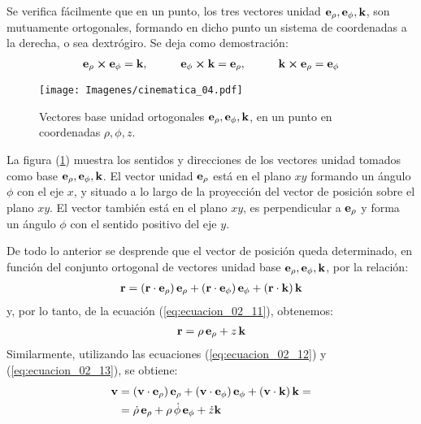 Se verifica fácilmente que en un punto, los tres vectores unidad $\vb{e}_{\rho}, \vb{e}_{\phi}, \vb{k}$, son mutuamente ortogonales, formando en dicho punto un sistema de coordenadas a la derecha, o sea dextrógiro. Se deja como demostración:
\begin{align}
\vb{e}_{\rho} \cp \vb{e}_{\phi} = \vb{k}, \hspace{1cm} \vb{e}_{\phi} \cp \vb{k} = \vb{e}_{\rho}, \hspace{1cm} \vb{k} \cp \vb{e}_{\rho} = \vb{e}_{\phi}
\label{eq:ecuacion_02_16}
\end{align}
\begin{figure}[H]
    \centering
    \texttt{[image: Imagenes/cinematica\_04.pdf]}
    \caption{Vectores base unidad ortogonales $\vb{e}_{\rho}, \vb{e}_{\phi}, \vb{k}$, en un punto en coordenadas $\rho, \phi, z$.}
    \label{fig:figura_02_04}    
\end{figure}
La figura (\ref{fig:figura_02_04}) muestra los sentidos y direcciones de los vectores unidad tomados como base $\vb{e}_{\rho}, \vb{e}_{\phi}, \vb{k}$. El vector unidad $\vb{e}_{\rho}$ está en el plano $x y$ formando un ángulo $\phi$ con el eje $x$, y situado a lo largo de la proyección del vector de posición sobre el plano $x y$. El vector también está en el plano $x y$, es perpendicular a $\vb{e}_{\rho}$ y forma un ángulo $\phi$ con el sentido positivo del eje $y$. 
\par
De todo lo anterior se desprende que el vector de posición queda determinado, en función del conjunto ortogonal de vectores unidad base $\vb{e}_{\rho}, \vb{e}_{\phi}, \vb{k}$, por la relación:
\begin{align*}
\vb{r} = \left( \vb{r} \cdot \vb{e}_{\rho} \right) \vb{e}_{\rho} + \left( \vb{r} \cdot \vb{e}_{\phi} \right) \vb{e}_{\phi} + \left( \vb{r} \cdot \vb{k} \right) \vb{k}
\end{align*}
y, por lo tanto, de la ecuación (\ref{eq:ecuacion_02_11}), obtenemos:
\begin{align}
\vb{r} = \rho \, \vb{e}_{\rho} +  z \, \vb{k}
\label{eq:ecuacion_02_17}
\end{align}
Similarmente, utilizando las ecuaciones (\ref{eq:ecuacion_02_12}) y (\ref{eq:ecuacion_02_13}), se obtiene:
\begin{align}
\begin{aligned}
\vb{v} &= \left( \vb{v} \cdot \vb{e}_{\rho} \right) \vb{e}_{\rho} + \left( \vb{v} \cdot \vb{e}_{\phi} \right) \vb{e}_{\phi} + \left( \vb{v} \cdot \vb{k} \right) \vb{k} = \\
&= \dot{\rho} \, \vb{e}_{\rho} + \rho \, \dot{\phi} \, \vb{e}_{\phi} + \dot{z} \vb{k}
\end{aligned}
\label{eq:ecuacion_02_18}
\end{align}
